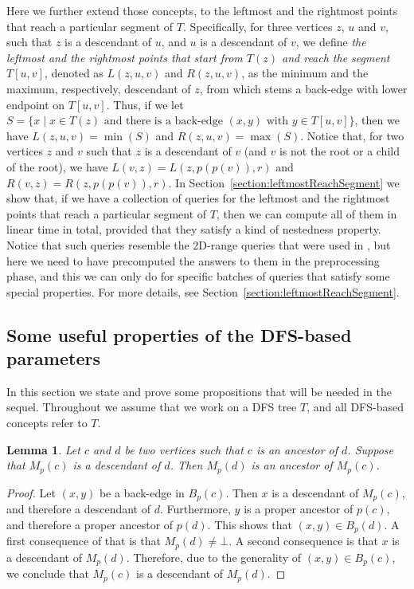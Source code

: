 \documentclass[11pt,a4paper]{article}
\newtheorem{lemma}[theorem]{Lemma}
\begin{document}
Here we further extend those concepts, to the leftmost and the rightmost points that reach a particular segment of $T$. Specifically, for three vertices $z$, $u$ and $v$, such that $z$ is a descendant of $u$, and $u$ is a descendant of $v$, we define \emph{the leftmost and the rightmost points that start from $T(z)$ and reach the segment $T[u,v]$}, denoted as $L(z,u,v)$ and $R(z,u,v)$, as the minimum and the maximum, respectively, descendant of $z$, from which stems a back-edge with lower endpoint on $T[u,v]$. Thus, if we let $S=\{x\mid x\in T(z) \mbox{ and there is a back-edge } (x,y) \mbox{ with } y\in T[u,v]\}$, then we have $L(z,u,v)=\min(S)$ and $R(z,u,v)=\max(S)$. Notice that, for two vertices $z$ and $v$ such that $z$ is a descendant of $v$ (and $v$ is not the root or a child of the root), we have $L(v,z)=L(z,p(p(v)),r)$ and $R(v,z)=R(z,p(p(v)),r)$. In Section~\ref{section:leftmostReachSegment} we show that, if we have a collection of queries for the leftmost and the rightmost points that reach a particular segment of $T$, then we can compute all of them in linear time in total, provided that they satisfy a kind of nestedness property. Notice that such queries resemble the 2D-range queries that were used in \cite{DBLP:conf/esa/Kosinas23}, but here we need to have precomputed the answers to them in the preprocessing phase, and this we can only do for specific batches of queries that satisfy some special properties. For more details, see Section~\ref{section:leftmostReachSegment}.

\subsection{Some useful properties of the DFS-based parameters}
\label{section:usefulProperties}

In this section we state and prove some propositions that will be needed in the sequel. Throughout we assume that we work on a DFS tree $T$, and all DFS-based concepts refer to $T$.

\begin{lemma}
\label{lemma:Mp}
Let $c$ and $d$ be two vertices such that $c$ is an ancestor of $d$. Suppose that $M_p(c)$ is a descendant of $d$. Then $M_p(d)$ is an ancestor of $M_p(c)$.
\end{lemma}
\begin{proof}
Let $(x,y)$ be a back-edge in $B_p(c)$. Then $x$ is a descendant of $M_p(c)$, and therefore a descendant of $d$. Furthermore, $y$ is a proper ancestor of $p(c)$, and therefore a proper ancestor of $p(d)$. This shows that $(x,y)\in B_p(d)$. A first consequence of that is that $M_p(d)\neq\bot$. A second consequence is that $x$ is a descendant of $M_p(d)$. Therefore, due to the generality of $(x,y)\in B_p(c)$, we conclude that $M_p(c)$ is a descendant of $M_p(d)$.
\end{proof}
\end{document}
